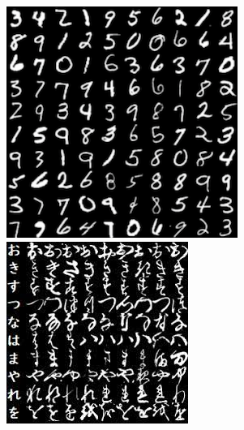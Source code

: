 \begin{figure}
    \includegraphics[width=\linewidth]{./Images/Chapter03/mnist_dataset.png}
  \endminipage\hfill
    \includegraphics[width=\linewidth]{./Images/Chapter03/kuzushiji_mnist.jpg}

\end{figure}
